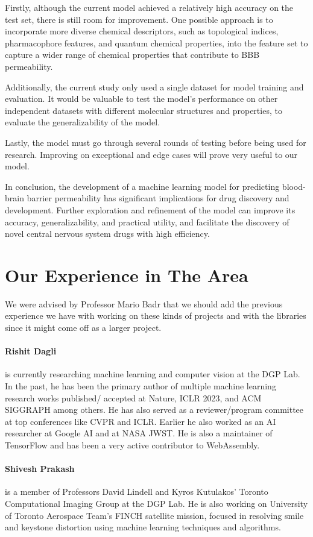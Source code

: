 \documentclass[fontsize=11pt]{article}
\begin{document}
Firstly, although the current model achieved a relatively high accuracy on the test set, there is still room for improvement. One possible approach is to incorporate more diverse chemical descriptors, such as topological indices, pharmacophore features, and quantum chemical properties, into the feature set to capture a wider range of chemical properties that contribute to BBB permeability.

Additionally, the current study only used a single dataset for model training and evaluation. It would be valuable to test the model's performance on other independent datasets with different molecular structures and properties, to evaluate the generalizability of the model.

Lastly, the model must go through several rounds of testing before being used for research. Improving on exceptional and edge cases will prove very useful to our model.

In conclusion, the development of a machine learning model for predicting blood-brain barrier permeability has significant implications for drug discovery and development. Further exploration and refinement of the model can improve its accuracy, generalizability, and practical utility, and facilitate the discovery of novel central nervous system drugs with high efficiency.

\section*{Our Experience in The Area}

We were advised by Professor Mario Badr that we should add the previous experience we have with working on these kinds of projects and with the libraries since it might come off as a larger project.

\paragraph{Rishit Dagli} is currently researching machine learning and computer vision at the DGP Lab. In the past, he has been the primary author of multiple machine learning research works published/ accepted at Nature, ICLR 2023, and ACM SIGGRAPH among others. He has also served as a reviewer/program committee at top conferences like CVPR and ICLR. Earlier he also worked as an AI researcher at Google AI and at NASA JWST. He is also a maintainer of TensorFlow and has been a very active contributor to WebAssembly.

\paragraph{Shivesh Prakash} is a member of Professors David Lindell and Kyros Kutulakos' Toronto Computational Imaging Group at the DGP Lab. He is also working on University of Toronto Aerospace Team's FINCH satellite mission, focused in resolving smile and keystone distortion using machine learning techniques and algorithms.
\end{document}
